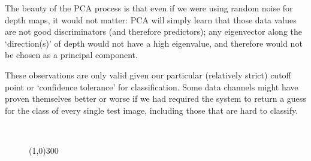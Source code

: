The beauty of the PCA process is that even if we were using random noise for depth maps, it would not matter: PCA will simply learn that those data values are not good discriminators (and therefore predictors); any eigenvector along the `direction(s)' of depth would not have a high eigenvalue, and therefore would not be chosen as a principal component.

These observations are only valid given our particular (relatively strict) cutoff point or `confidence tolerance' for classification. Some data channels might have proven themselves better or worse if we had required the system to return a guess for the class of every single test image, including those that are hard to classify.

\begin{figure}[h]
 \centering

 \\

\begin{center}
\line(1,0){300}
\end{center}


\end{figure}
